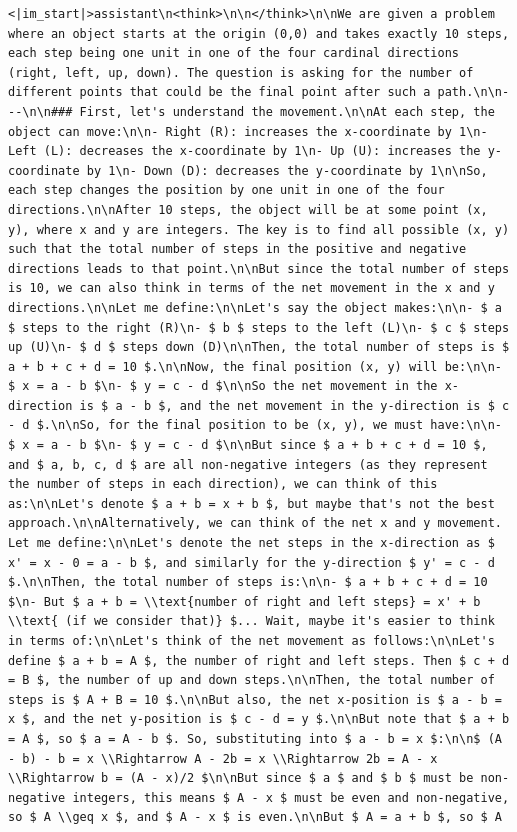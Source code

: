 \begin{responsebox}
\begin{Verbatim}[breaklines=true, breakanywhere=true, fontsize=\small]
<|im_start|>assistant\n<think>\n\n</think>\n\nWe are given a problem where an object starts at the origin (0,0) and takes exactly 10 steps, each step being one unit in one of the four cardinal directions (right, left, up, down). The question is asking for the number of different points that could be the final point after such a path.\n\n---\n\n### First, let's understand the movement.\n\nAt each step, the object can move:\n\n- Right (R): increases the x-coordinate by 1\n- Left (L): decreases the x-coordinate by 1\n- Up (U): increases the y-coordinate by 1\n- Down (D): decreases the y-coordinate by 1\n\nSo, each step changes the position by one unit in one of the four directions.\n\nAfter 10 steps, the object will be at some point (x, y), where x and y are integers. The key is to find all possible (x, y) such that the total number of steps in the positive and negative directions leads to that point.\n\nBut since the total number of steps is 10, we can also think in terms of the net movement in the x and y directions.\n\nLet me define:\n\nLet's say the object makes:\n\n- $ a $ steps to the right (R)\n- $ b $ steps to the left (L)\n- $ c $ steps up (U)\n- $ d $ steps down (D)\n\nThen, the total number of steps is $ a + b + c + d = 10 $.\n\nNow, the final position (x, y) will be:\n\n- $ x = a - b $\n- $ y = c - d $\n\nSo the net movement in the x-direction is $ a - b $, and the net movement in the y-direction is $ c - d $.\n\nSo, for the final position to be (x, y), we must have:\n\n- $ x = a - b $\n- $ y = c - d $\n\nBut since $ a + b + c + d = 10 $, and $ a, b, c, d $ are all non-negative integers (as they represent the number of steps in each direction), we can think of this as:\n\nLet's denote $ a + b = x + b $, but maybe that's not the best approach.\n\nAlternatively, we can think of the net x and y movement. Let me define:\n\nLet's denote the net steps in the x-direction as $ x' = x - 0 = a - b $, and similarly for the y-direction $ y' = c - d $.\n\nThen, the total number of steps is:\n\n- $ a + b + c + d = 10 $\n- But $ a + b = \\text{number of right and left steps} = x' + b \\text{ (if we consider that)} $... Wait, maybe it's easier to think in terms of:\n\nLet's think of the net movement as follows:\n\nLet's define $ a + b = A $, the number of right and left steps. Then $ c + d = B $, the number of up and down steps.\n\nThen, the total number of steps is $ A + B = 10 $.\n\nBut also, the net x-position is $ a - b = x $, and the net y-position is $ c - d = y $.\n\nBut note that $ a + b = A $, so $ a = A - b $. So, substituting into $ a - b = x $:\n\n$ (A - b) - b = x \\Rightarrow A - 2b = x \\Rightarrow 2b = A - x \\Rightarrow b = (A - x)/2 $\n\nBut since $ a $ and $ b $ must be non-negative integers, this means $ A - x $ must be even and non-negative, so $ A \\geq x $, and $ A - x $ is even.\n\nBut $ A = a + b $, so $ A 
\end{Verbatim}
\end{responsebox}
